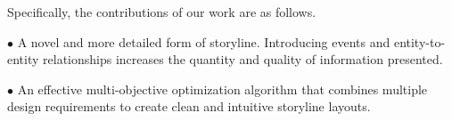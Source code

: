 Specifically, the contributions of our work are as follows.

$\bullet$ A novel and more detailed form of storyline. Introducing events and entity-to-entity relationships increases the quantity and quality of information presented.

$\bullet$ An effective multi-objective optimization algorithm that combines multiple design requirements to create clean and intuitive storyline layouts.

